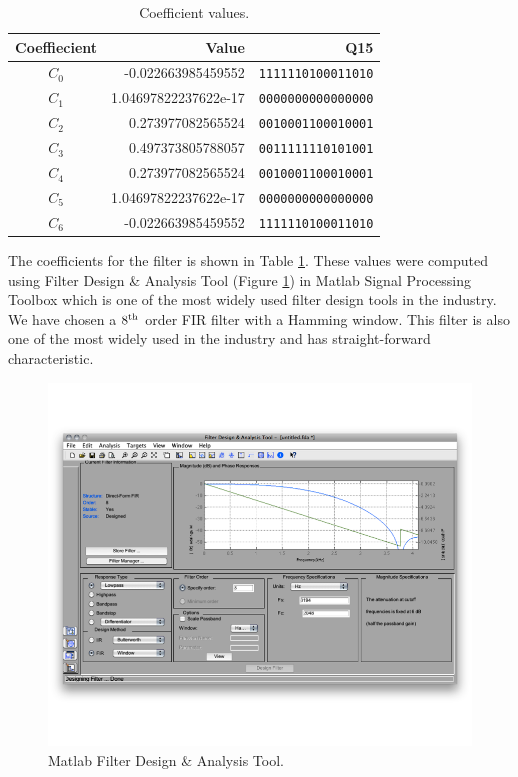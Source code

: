 \begin{table}[htbp]
\centering
\begin{tabular}{ c | r | r }
\hline
Coeffiecient & Value & Q15 \\
\hline \hline
$C_0$ & -0.022663985459552   & \texttt{1111110100011010} \\
$C_1$ & 1.04697822237622e-17 & \texttt{0000000000000000} \\
$C_2$ & 0.273977082565524    & \texttt{0010001100010001}\\
$C_3$ & 0.497373805788057    & \texttt{0011111110101001}\\
$C_4$ & 0.273977082565524    & \texttt{0010001100010001}\\
$C_5$ & 1.04697822237622e-17 & \texttt{0000000000000000} \\
$C_6$ & -0.022663985459552   & \texttt{1111110100011010} \\
\end{tabular}
\caption{Coefficient values.}
\label{tab:coefficients}
\end{table}

The coefficients for the filter is shown in Table \ref{tab:coefficients}. These values were computed using Filter Design \& Analysis Tool (Figure \ref{fig:matlab}) in Matlab Signal Processing Toolbox which is one of the most widely used filter design tools in the industry. We have chosen a $8^{\rm th}$ order FIR filter with a Hamming window. This filter is also one of the most widely used in the industry and has straight-forward characteristic.

\begin{figure}[htbp]
	\centering
	\includegraphics[width=6.5in]{images/matlab}
	\caption{Matlab Filter Design \& Analysis Tool.}
	\label{fig:matlab}
\end{figure}
